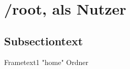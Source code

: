 \section[/root]{/root, als Nutzer}
\subsection{Subsectiontext}
\begin{frame}{Frametext1}
"home" Ordner
\end{frame}
